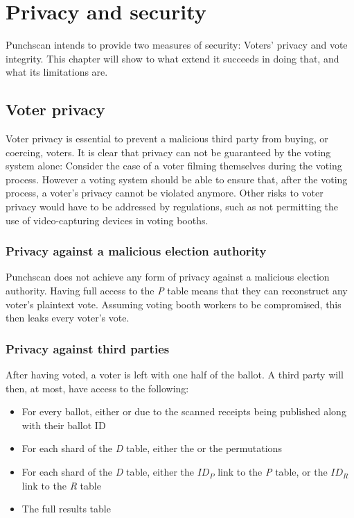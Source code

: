 \chapter{Privacy and security}

Punchscan intends to provide two measures of security: Voters' privacy and vote
integrity. This chapter will show to what extend it succeeds in doing that, and
what its limitations are.

\section{Voter privacy}

Voter privacy is essential to prevent a malicious third party from buying, or
coercing, voters. It is clear that privacy can not be guaranteed by the voting
system alone: Consider the case of a voter filming themselves during the voting
process. However a voting system should be able to ensure that, after the
voting process, a voter's privacy cannot be violated anymore. Other risks to
voter privacy would have to be addressed by regulations, such as not
permitting the use of video-capturing devices in voting booths.

\subsection{Privacy against a malicious election authority}

Punchscan does not achieve any form of privacy against a malicious election
authority. Having full access to the \emph{P} table means that they can
reconstruct any voter's plaintext vote. Assuming voting booth workers to be
compromised, this then leaks every voter's vote.

\subsection{Privacy against third parties}

After having voted, a voter is left with one half of the ballot. A third party
will then, at most, have access to the following:
\begin{itemize}
\item For every ballot, either \ptop{} or \pbottom{} due to the scanned receipts being published along with their ballot ID
\item For each shard of the \emph{D} table, either the \pone{} or the \ptwo{}
permutations
\item For each shard of the \emph{D} table, either the $ID_P$ link to the
\emph{P} table, or the $ID_R$ link to the \emph{R} table
\item The full results table
\end{itemize}

